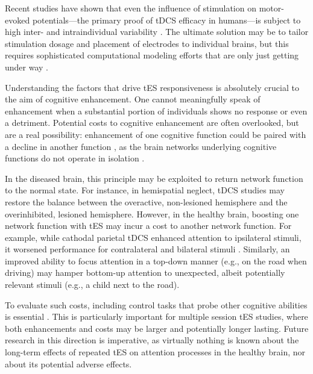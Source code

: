 \documentclass[11pt,english,]{memoir}
\begin{document}
Recent studies have shown that even the influence of stimulation on motor-evoked potentials---the primary proof of tDCS efficacy in humans---is subject to high inter- \autocites{Lopez-Alonso2014}{Strube2016}{Wiethoff2014} and intraindividual variability \autocites{Dyke2016}{Lopez-Alonso2015}{Horvath2015b}. The ultimate solution may be to tailor stimulation dosage and placement of electrodes to individual brains, but this requires sophisticated computational modeling efforts that are only just getting under way \autocites{DeBerker2013}{Bikson2012}.

Understanding the factors that drive tES responsiveness is absolutely crucial to the aim of cognitive enhancement. One cannot meaningfully speak of enhancement when a substantial portion of individuals shows no response or even a detriment. Potential costs to cognitive enhancement are often overlooked, but are a real possibility: enhancement of one cognitive function could be paired with a decline in another function \autocites{Brem2014a}{Iuculano2013}{Sarkar2014}, as the brain networks underlying cognitive functions do not operate in isolation \autocite{Wokke2015}.

In the diseased brain, this principle may be exploited to return network function to the normal state. For instance, in hemispatial neglect, tDCS studies may restore the balance between the overactive, non-lesioned hemisphere and the overinhibited, lesioned hemisphere. However, in the healthy brain, boosting one network function with tES may incur a cost to another network function. For example, while cathodal parietal tDCS enhanced attention to ipsilateral stimuli, it worsened performance for contralateral and bilateral stimuli \autocites{Filmer2015}{Sparing2009}. Similarly, an improved ability to focus attention in a top-down manner (e.g., on the road when driving) may hamper bottom-up attention to unexpected, albeit potentially relevant stimuli (e.g., a child next to the road).

To evaluate such costs, including control tasks that probe other cognitive abilities is essential \autocites{Wokke2015}{Parkin2015}. This is particularly important for multiple session tES studies, where both enhancements and costs may be larger and potentially longer lasting. Future research in this direction is imperative, as virtually nothing is known about the long-term effects of repeated tES on attention processes in the healthy brain, nor about its potential adverse effects.
\end{document}
